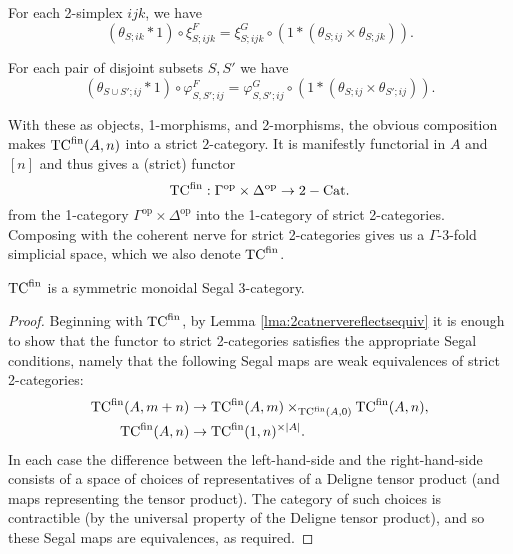 \documentclass{amsart}
\begin{document}
\begin{list}{(TC2M)}{}
	\item For each 2-simplex $ijk$, we have
	\begin{equation*}
		(\theta_{S; ik} * 1) \circ \xi^F_{S; ijk} = \xi^G_{S;ijk} \circ (1 * (\theta_{S; ij} \times \theta_{S; jk})).
	\end{equation*}
	\item For each pair of disjoint subsets $S, S'$ we have
	\begin{equation*}
		(\theta_{S \cup S'; ij} * 1) \circ \varphi^F_{S, S'; ij} = \varphi^G_{S,S';ij} \circ (1*(\theta_{S;ij} \times \theta_{S';ij})).
	\end{equation*}
\end{list}
With these as objects, 1-morphisms, and 2-morphisms, the obvious composition makes ${\mathrm{TC}^{\text{fin}}}(A,n)$ into a strict $2$-category.  
It is manifestly functorial in $A$ and $[n]$ and thus gives a (strict) functor 
\begin{equation*}
	{\mathrm{TC}^{\text{fin}}}: \Gamma^\textrm{op} \times \Delta^\textrm{op} \to 2-\mathrm{Cat}.
\end{equation*}
from the 1-category $\Gamma^\textrm{op} \times \Delta^\textrm{op}$ into the 1-category of strict 2-categories. Composing with the coherent nerve for strict 2-categories gives us a $\Gamma$-3-fold simplicial space, which we also denote ${\mathrm{TC}^{\text{fin}}}$. 

\begin{theorem}
	 ${\mathrm{TC}^{\text{fin}}}$ is a symmetric monoidal Segal 3-category.  
\end{theorem}
\begin{proof}
	Beginning with ${\mathrm{TC}^{\text{fin}}}$,
	by Lemma \ref{lma:2catnervereflectsequiv} it is enough to show that the functor to strict 2-categories satisfies the appropriate Segal conditions, namely that the following Segal maps are weak equivalences of strict 2-categories: 
	\begin{align*}
		{\mathrm{TC}^{\text{fin}}}(A, m + n) & \to {\mathrm{TC}^{\text{fin}}}(A, m) \times_{{\mathrm{TC}^{\text{fin}}}(A, 0)} {\mathrm{TC}^{\text{fin}}}(A, n), \\
		{\mathrm{TC}^{\text{fin}}}(A, n) & \to {\mathrm{TC}^{\text{fin}}}(1, n)^{\times |A|}. 
	\end{align*}
In each case the difference between the left-hand-side and the right-hand-side consists of a space of choices of representatives of a Deligne tensor product (and maps representing the tensor product). The category of such choices is contractible (by the universal property of the Deligne tensor product), and so these Segal maps are equivalences, as required. 
\end{proof}
\end{document}
